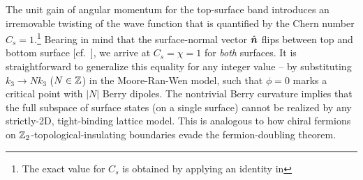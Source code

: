 \documentclass[aps,prl,showpacs,twocolumn,superscriptaddress]{revtex4-1}
\begin{document}

The unit gain of angular momentum for the top-surface band introduces an irremovable twisting of the wave function that is quantified by the Chern number $C_s=1$.\footnote{The exact value for $C_s$ is obtained by applying an identity in } Bearing in mind that the surface-normal vector $\hat{\boldsymbol{n}}$ flips between top and bottom surface [cf.\ ], we arrive at  $C_s=\chi=1$ for \textit{both}  surfaces.  It is straightforward to generalize this equality for any integer value -- by substituting $k_3 \rightarrow N k_3$  ($N\in \mathbb{Z}$) in the Moore-Ran-Wen model, such that   $\phi=0$ marks a critical point  with  $|N|$  Berry dipoles. The nontrivial Berry curvature implies that the full subspace of surface states (on a single surface) cannot be realized by any strictly-2D, tight-binding lattice model. This is analogous to how chiral fermions on $\mathbb{Z}_2$-topological-insulating boundaries\cite{callanharvey_anomalies} evade the fermion-doubling theorem.\cite{nielsen_ninomiya,nielsen_ninomiya_II}







\end{document}
